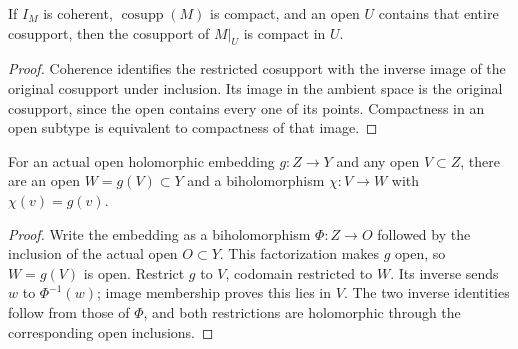 \begin{lemma}
\label{hir:original-old-branch-lowdep-restricted-compact}
\leanok
If $I_M$ is coherent, $\operatorname{cosupp}(M)$ is compact, and an
open $U$ contains that entire cosupport, then the cosupport of
$M|_U$ is compact in $U$.
\end{lemma}
\begin{proof}
Coherence identifies the restricted cosupport with the inverse image
of the original cosupport under inclusion. Its image in the ambient
space is the original cosupport, since the open contains every one of
its points. Compactness in an open subtype is equivalent to compactness
of that image.
\end{proof}

\begin{lemma}
\label{hir:original-old-branch-lowdep-open-image}
\leanok
For an actual open holomorphic embedding $g:Z\to Y$ and any open
$V\subset Z$, there are an open $W=g(V)\subset Y$ and a
biholomorphism $\chi:V\to W$ with $\chi(v)=g(v)$.
\end{lemma}
\begin{proof}
Write the embedding as a biholomorphism $\Phi:Z\to O$ followed by
the inclusion of the actual open $O\subset Y$. This factorization
makes $g$ open, so $W=g(V)$ is open. Restrict $g$ to $V$, codomain
restricted to $W$. Its inverse sends $w$ to $\Phi^{-1}(w)$; image
membership proves this lies in $V$. The two inverse identities follow
from those of $\Phi$, and both restrictions are holomorphic through
the corresponding open inclusions.
\end{proof}

